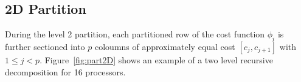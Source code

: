 \documentclass[prl,twocolumn,twocolumngrid,superbib]{revtex4}
\begin{document}
\subsection{2D Partition}
 During the level 2 partition, each partitioned row of the cost function $\phi_{i}$
 is further sectioned into $p$ coloumns of approximately equal cost $[c_j,c_{j+1}]$ with $1 \le j < p$.
 Figure~\ref{fig:part2D} shows an example of a two level recursive decomposition
 for 16 processors.

 
\end{document}

